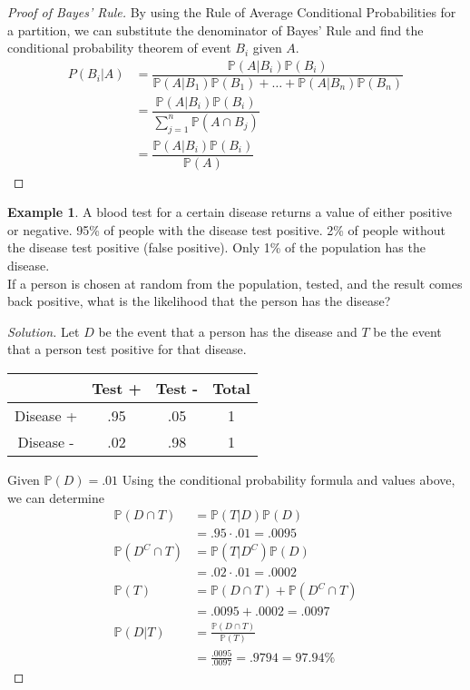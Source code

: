 \documentclass[12pt]{article}
\newcommand{\bbP}{\mathbb{P}}
\renewcommand{\_}[1]{\underline{ #1 }}
\theoremstyle{definition}
\newtheorem{example}[theorem]{Example}
\numberwithin{equation}{subsection}
\begin{document}
	\begin{proof}[Proof of Bayes' Rule]
		By using the Rule of Average Conditional Probabilities for a partition, we can substitute the denominator of Bayes' Rule and find the conditional probability theorem of event $B_i$ given $A$.
		\begin{align*}
			P(B_i|A)&=\dfrac{\bbP(A|B_i)\bbP(B_i)}{\bbP(A|B_1)\bbP(B_1)+\dots +\bbP(A|B_n)\bbP(B_n)} \\
			&=\dfrac{\bbP(A|B_i)\bbP(B_i)}{\sum_{j=1}^n \bbP(A\cap B_j)} \\
			&=\dfrac{\bbP(A|B_i)\bbP(B_i)}{\bbP(A)}
		\end{align*}
	\end{proof}

	\begin{example}
		A blood test for a certain disease returns a value of either positive or negative. 95\% of people with the disease test positive. 2\% of people without the disease test positive (false positive). Only 1\% of the population has the disease. \\
		If a person is chosen at random from the population, tested, and the result comes back positive, what is the likelihood that the person has the disease?
		
		\begin{proof}[Solution]
			Let $D$ be the event that a person has the disease and $T$ be the event that a person test positive for that disease.
			\begin{center}
				\begin{tabular}{ |c|c|c|c| } 
				 	\hline
										& Test + & Test - & Total \\
					\hline
				  Disease + & .95 & .05 & 1 \\ 
					\hline
				 	Disease - & .02 & .98 & 1 \\ 
					\hline
				\end{tabular}
			\end{center}
			Given $\bbP(D)=.01$
			Using the conditional probability formula and values above, we can determine
			\begin{align*}
				\bbP(D\cap T)&=\bbP(T|D)\bbP(D) \\
					&=.95\cdot .01=.0095 \\
				\bbP(D^C\cap T)&=\bbP(T|D^C)\bbP(D) \\
					&=.02\cdot .01=.0002 \\
				\bbP(T)&=\bbP(D\cap T)+\bbP(D^C\cap T) \\
					&=.0095+.0002=.0097 \\
				\bbP(D|T)&=\frac{\bbP(D\cap T)}{\bbP(T)} \\
					&=\frac{.0095}{.0097}=.9794=97.94\%
			\end{align*}
		\end{proof}
	\end{example}
\end{document}
